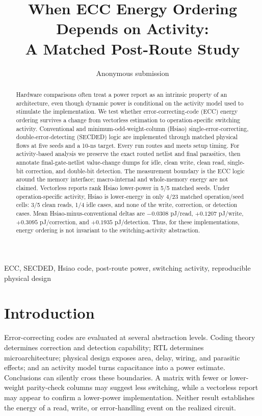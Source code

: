 \documentclass[conference,10pt]{IEEEtran}
\begin{document}
\title{When ECC Energy Ordering Depends on Activity:\\A Matched Post-Route Study}
\author{Anonymous submission}
\maketitle
\thispagestyle{empty}

\begin{abstract}
Hardware comparisons often treat a power report as an intrinsic property of an architecture, even though dynamic power is conditional on the activity model used to stimulate the implementation. We test whether error-correcting-code (ECC) energy ordering survives a change from vectorless estimation to operation-specific switching activity. Conventional and minimum-odd-weight-column (Hsiao) single-error-correcting, double-error-detecting (SECDED) logic are implemented through matched physical flows at five seeds and a 10-ns target. Every run routes and meets setup timing. For activity-based analysis we preserve the exact routed netlist and final parasitics, then annotate final-gate-netlist value-change dumps for idle, clean write, clean read, single-bit correction, and double-bit detection. The measurement boundary is the ECC logic around the memory interface; macro-internal and whole-memory energy are not claimed. Vectorless reports rank Hsiao lower-power in 5/5 matched seeds. Under operation-specific activity, Hsiao is lower-energy in only 4/23 matched operation/seed cells: 3/5 clean reads, 1/4 idle cases, and none of the write, correction, or detection cases. Mean Hsiao-minus-conventional deltas are $-0.0308$ pJ/read, $+0.1207$ pJ/write, $+0.3095$ pJ/correction, and $+0.1935$ pJ/detection. Thus, for these implementations, energy ordering is not invariant to the switching-activity abstraction.
\end{abstract}

\begin{IEEEkeywords}
ECC, SECDED, Hsiao code, post-route power, switching activity, reproducible physical design
\end{IEEEkeywords}

\section{Introduction}
Error-correcting codes are evaluated at several abstraction levels. Coding theory determines correction and detection capability; RTL determines microarchitecture; physical design exposes area, delay, wiring, and parasitic effects; and an activity model turns capacitance into a power estimate. Conclusions can silently cross these boundaries. A matrix with fewer or lower-weight parity-check columns may suggest less switching, while a vectorless report may appear to confirm a lower-power implementation. Neither result establishes the energy of a read, write, or error-handling event on the realized circuit.
\end{document}

